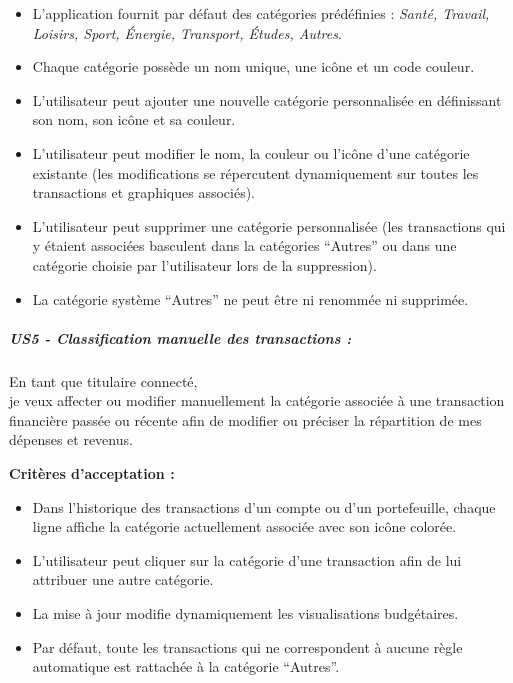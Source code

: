 \begin{itemize}
\tightlist
\item
  L'application fournit par défaut des catégories prédéfinies :
  \emph{Santé, Travail, Loisirs, Sport, Énergie, Transport, Études,
  Autres}.
\item
  Chaque catégorie possède un nom unique, une icône et un code couleur.
\item
  L'utilisateur peut ajouter une nouvelle catégorie personnalisée en
  définissant son nom, son icône et sa couleur.
\item
  L'utilisateur peut modifier le nom, la couleur ou l'icône d'une
  catégorie existante (les modifications se répercutent dynamiquement
  sur toutes les transactions et graphiques associés).
\item
  L'utilisateur peut supprimer une catégorie personnalisée (les
  transactions qui y étaient associées basculent dans la catégories
  ``Autres'' ou dans une catégorie choisie par l'utilisateur lors de la
  suppression).
\item
  La catégorie système ``Autres'' ne peut être ni renommée ni supprimée.
\end{itemize}

\hypertarget{us5---classification-manuelle-des-transactions}{%
\subparagraph{US5 - Classification manuelle des transactions
:}\label{us5---classification-manuelle-des-transactions}}

En tant que titulaire connecté,\\
je veux affecter ou modifier manuellement la catégorie associée à une
transaction financière passée ou récente afin de modifier ou préciser la
répartition de mes dépenses et revenus.

\textbf{Critères d'acceptation :}

\begin{itemize}
\tightlist
\item
  Dans l'historique des transactions d'un compte ou d'un portefeuille,
  chaque ligne affiche la catégorie actuellement associée avec son icône
  colorée.
\item
  L'utilisateur peut cliquer sur la catégorie d'une transaction afin de
  lui attribuer une autre catégorie.
\item
  La mise à jour modifie dynamiquement les visualisations budgétaires.
\item
  Par défaut, toute les transactions qui ne correspondent à aucune règle
  automatique est rattachée à la catégorie ``Autres''.
\end{itemize}

